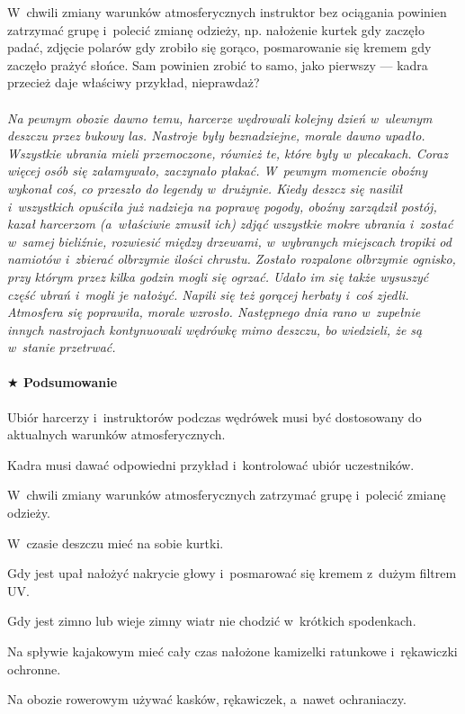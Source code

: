 \documentclass[a5paper,10pt,titlepage,twoside]{article}
\newcommand*{\thecheckbox}{\hss$\Box$} %
\newenvironment*{checklist}
{\list{}{%
\renewcommand*{\makelabel}[1]{\thecheckbox}}}
{\endlist}
\begin{document}
W~chwili zmiany warunków atmosferycznych instruktor bez ociągania powinien zatrzymać grupę i~polecić zmianę odzieży, np. nałożenie kurtek gdy zaczęło padać, zdjęcie polarów gdy zrobiło się gorąco, posmarowanie się kremem gdy zaczęło prażyć słońce. Sam powinien zrobić to samo, jako pierwszy --- kadra przecież daje właściwy przykład, nieprawdaż?
\\
\\
\small{
\emph{Na pewnym obozie dawno temu, harcerze wędrowali kolejny dzień w~ulewnym deszczu przez bukowy las. Nastroje były beznadziejne, morale dawno upadło. Wszystkie ubrania mieli przemoczone, również te, które były w~plecakach. Coraz więcej osób się załamywało, zaczynało płakać. W~pewnym momencie oboźny wykonał coś, co przeszło do legendy w~drużynie. Kiedy deszcz się nasilił i~wszystkich opuściła już nadzieja na poprawę pogody, oboźny zarządził postój, kazał harcerzom (a~właściwie zmusił ich) zdjąć wszystkie mokre ubrania i~zostać w~samej bieliźnie, rozwiesić między drzewami, w~wybranych miejscach tropiki od namiotów i~zbierać olbrzymie ilości chrustu. Zostało rozpalone olbrzymie ognisko, przy którym przez kilka godzin mogli się ogrzać. Udało im się także wysuszyć część ubrań i~mogli je nałożyć. Napili się też gorącej herbaty i~coś zjedli. Atmosfera się poprawiła, morale wzrosło. Następnego dnia rano w~zupełnie innych nastrojach kontynuowali wędrówkę mimo deszczu, bo wiedzieli, że są w~stanie przetrwać.}}
\paragraph{$\bigstar$ Podsumowanie}
\begin{checklist}
\item Ubiór harcerzy i~instruktorów podczas wędrówek musi być dostosowany do aktualnych warunków atmosferycznych.
\item Kadra musi dawać odpowiedni przykład i~kontrolować ubiór uczestników.
\item W~chwili zmiany warunków atmosferycznych zatrzymać grupę i~polecić zmianę odzieży.
\item W~czasie deszczu mieć na sobie kurtki.
\item Gdy jest upał nałożyć nakrycie głowy i~posmarować się kremem z~dużym filtrem UV.
\item Gdy jest zimno lub wieje zimny wiatr nie chodzić w~krótkich spodenkach.
\item Na spływie kajakowym mieć cały czas nałożone kamizelki ratunkowe i~rękawiczki ochronne.
\item Na obozie rowerowym używać kasków, rękawiczek, a~nawet ochraniaczy.
\end{checklist}
\end{document}
